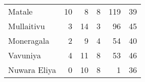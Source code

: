 \begin{tabular}{lrrrrr}
Matale       &          10 &           8 &            8 &              119 &          39 \\
Mullaitivu   &           3 &          14 &            3 &               96 &          45 \\
Moneragala   &           2 &           9 &            4 &               54 &          40 \\
Vavuniya     &           4 &          11 &            8 &               53 &          46 \\
Nuwara Eliya &           0 &          10 &            8 &                1 &          36 \\
\bottomrule
\end{tabular}
